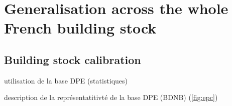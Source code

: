 \documentclass[11pt]{article}
\begin{document}

\clearpage
\section{Generalisation across the whole French building stock}
\label{sec:generalisation}
    
    \subsection{Building stock calibration} %
    \label{sub:calibration}
    
    utilisation de la base DPE (statistiques)

    description de la représentatitivté de la base DPE (BDNB) (\ref{fig:epc})
\end{document}
